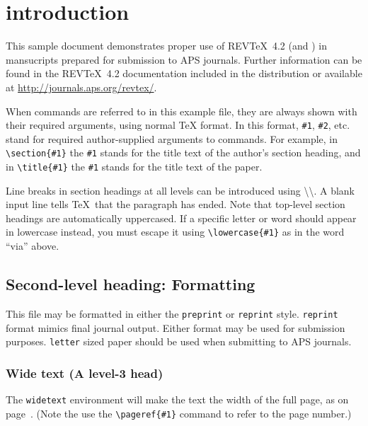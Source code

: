 \documentclass[%
reprint,
amsmath,amssymb,
aps,
]{revtex4-2}
\begin{document}
	\maketitle
	
	
	\section{\label{sec:level1}
		introduction}
	
	This sample document demonstrates proper use of REV\TeX~4.2 (and
	\LaTeXe) in mansucripts prepared for submission to APS
	journals. Further information can be found in the REV\TeX~4.2
	documentation included in the distribution or available at
	\url{http://journals.aps.org/revtex/}.
	
	When commands are referred to in this example file, they are always
	shown with their required arguments, using normal \TeX{} format. In
	this format, \verb+#1+, \verb+#2+, etc. stand for required
	author-supplied arguments to commands. For example, in
	\verb+\section{#1}+ the \verb+#1+ stands for the title text of the
	author's section heading, and in \verb+\title{#1}+ the \verb+#1+
	stands for the title text of the paper.
	
	Line breaks in section headings at all levels can be introduced using
	\textbackslash\textbackslash. A blank input line tells \TeX\ that the
	paragraph has ended. Note that top-level section headings are
	automatically uppercased. If a specific letter or word should appear in
	lowercase instead, you must escape it using \verb+\lowercase{#1}+ as
	in the word ``via'' above.
	
	\subsection{\label{sec:level2}Second-level heading: Formatting}
	
	This file may be formatted in either the \texttt{preprint} or
	\texttt{reprint} style. \texttt{reprint} format mimics final journal output. 
	Either format may be used for submission purposes. \texttt{letter} sized paper should
	be used when submitting to APS journals.
	
	\subsubsection{Wide text (A level-3 head)}
	The \texttt{widetext} environment will make the text the width of the
	full page, as on page~\pageref{eq:wideeq}. (Note the use the
	\verb+\pageref{#1}+ command to refer to the page number.) 
\end{document}
